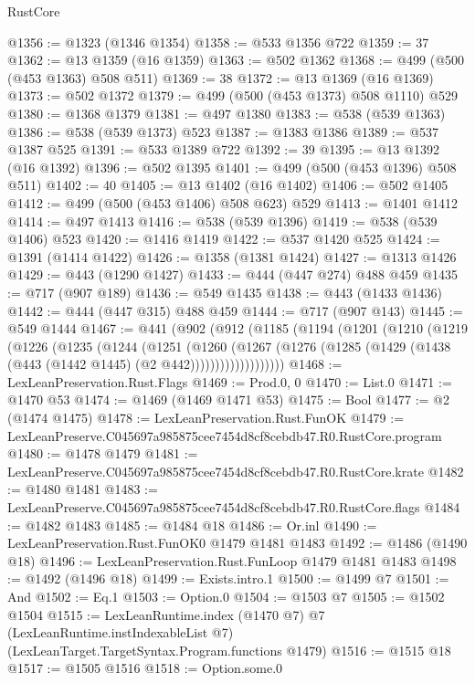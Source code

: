 \begin{lexlean}{RustCore}
\begin{coremodule}
@1356 := @1323 (@1346 @1354)
@1358 := @533 @1356 @722
@1359 := 37
@1362 := @13 @1359 (@16 @1359)
@1363 := @502 @1362
@1368 := @499 (@500 (@453 @1363) @508 @511)
@1369 := 38
@1372 := @13 @1369 (@16 @1369)
@1373 := @502 @1372
@1379 := @499 (@500 (@453 @1373) @508 @1110) @529
@1380 := @1368 @1379
@1381 := @497 @1380
@1383 := @538 (@539 @1363)
@1386 := @538 (@539 @1373) @523
@1387 := @1383 @1386
@1389 := @537 @1387 @525
@1391 := @533 @1389 @722
@1392 := 39
@1395 := @13 @1392 (@16 @1392)
@1396 := @502 @1395
@1401 := @499 (@500 (@453 @1396) @508 @511)
@1402 := 40
@1405 := @13 @1402 (@16 @1402)
@1406 := @502 @1405
@1412 := @499 (@500 (@453 @1406) @508 @623) @529
@1413 := @1401 @1412
@1414 := @497 @1413
@1416 := @538 (@539 @1396)
@1419 := @538 (@539 @1406) @523
@1420 := @1416 @1419
@1422 := @537 @1420 @525
@1424 := @1391 (@1414 @1422)
@1426 := @1358 (@1381 @1424)
@1427 := @1313 @1426
@1429 := @443 (@1290 @1427)
@1433 := @444 (@447 @274) @488 @459
@1435 := @717 (@907 @189)
@1436 := @549 @1435
@1438 := @443 (@1433 @1436)
@1442 := @444 (@447 @315) @488 @459
@1444 := @717 (@907 @143)
@1445 := @549 @1444
@1467 := @441
    (@902
      (@912
        (@1185
          (@1194
            (@1201
              (@1210
                (@1219
                  (@1226
                    (@1235
                      (@1244
                        (@1251
                          (@1260
                            (@1267
                              (@1276
                                (@1285 (@1429 (@1438 (@443 (@1442 @1445) (@2 @442)))))))))))))))))))
@1468 := LexLeanPreservation.Rust.Flags
@1469 := Prod.{0, 0}
@1470 := List.{0}
@1471 := @1470 @53
@1474 := @1469 (@1469 @1471 @53)
@1475 := Bool
@1477 := @2 (@1474 @1475)
@1478 := LexLeanPreservation.Rust.FunOK
@1479 := LexLeanPreserve.C045697a985875cee7454d8cf8cebdb47.R0.RustCore.program
@1480 := @1478 @1479
@1481 := LexLeanPreserve.C045697a985875cee7454d8cf8cebdb47.R0.RustCore.krate
@1482 := @1480 @1481
@1483 := LexLeanPreserve.C045697a985875cee7454d8cf8cebdb47.R0.RustCore.flags
@1484 := @1482 @1483
@1485 := @1484 @18
@1486 := Or.inl
@1490 := LexLeanPreservation.Rust.FunOK0 @1479 @1481 @1483
@1492 := @1486 (@1490 @18)
@1496 := LexLeanPreservation.Rust.FunLoop @1479 @1481 @1483
@1498 := @1492 (@1496 @18)
@1499 := Exists.intro.{1}
@1500 := @1499 @7
@1501 := And
@1502 := Eq.{1}
@1503 := Option.{0}
@1504 := @1503 @7
@1505 := @1502 @1504
@1515 := LexLeanRuntime.index
    (@1470 @7)
    @7
    (LexLeanRuntime.instIndexableList @7)
    (LexLeanTarget.TargetSyntax.Program.functions @1479)
@1516 := @1515 @18
@1517 := @1505 @1516
@1518 := Option.some.{0}

\end{coremodule}
\end{lexlean}

